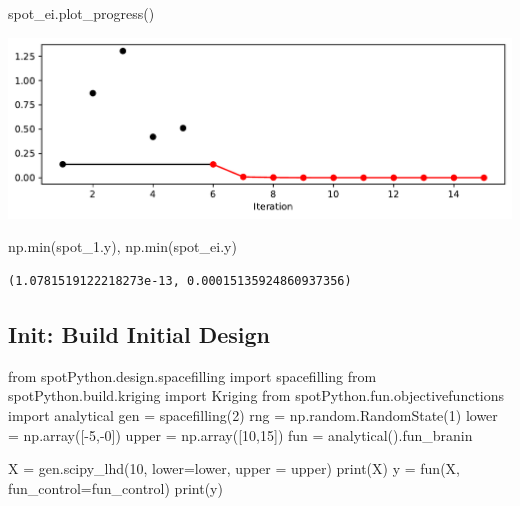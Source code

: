 \documentclass[
  letterpaper,
  DIV=11,
  numbers=noendperiod]{scrreprt}
\newenvironment{Shaded}{\begin{snugshade}}{\end{snugshade}}
\newcommand{\BuiltInTok}[1]{\textcolor[rgb]{0.00,0.23,0.31}{#1}}
\newcommand{\DecValTok}[1]{\textcolor[rgb]{0.68,0.00,0.00}{#1}}
\newcommand{\ImportTok}[1]{\textcolor[rgb]{0.00,0.46,0.62}{#1}}
\newcommand{\NormalTok}[1]{\textcolor[rgb]{0.00,0.23,0.31}{#1}}
\newcommand{\OperatorTok}[1]{\textcolor[rgb]{0.37,0.37,0.37}{#1}}
\begin{document}
\begin{Shaded}
\begin{Highlighting}[]
\NormalTok{spot\_ei.plot\_progress()}
\end{Highlighting}
\end{Shaded}

\includegraphics{012_num_spot_ei_files/figure-pdf/cell-18-output-1.pdf}

\begin{Shaded}
\begin{Highlighting}[]
\NormalTok{np.}\BuiltInTok{min}\NormalTok{(spot\_1.y), np.}\BuiltInTok{min}\NormalTok{(spot\_ei.y)}
\end{Highlighting}
\end{Shaded}

\begin{verbatim}
(1.0781519122218273e-13, 0.00015135924860937356)
\end{verbatim}

\subsection{Init: Build Initial Design}\label{init-build-initial-design}

\begin{Shaded}
\begin{Highlighting}[]
\ImportTok{from}\NormalTok{ spotPython.design.spacefilling }\ImportTok{import}\NormalTok{ spacefilling}
\ImportTok{from}\NormalTok{ spotPython.build.kriging }\ImportTok{import}\NormalTok{ Kriging}
\ImportTok{from}\NormalTok{ spotPython.fun.objectivefunctions }\ImportTok{import}\NormalTok{ analytical}
\NormalTok{gen }\OperatorTok{=}\NormalTok{ spacefilling(}\DecValTok{2}\NormalTok{)}
\NormalTok{rng }\OperatorTok{=}\NormalTok{ np.random.RandomState(}\DecValTok{1}\NormalTok{)}
\NormalTok{lower }\OperatorTok{=}\NormalTok{ np.array([}\OperatorTok{{-}}\DecValTok{5}\NormalTok{,}\OperatorTok{{-}}\DecValTok{0}\NormalTok{])}
\NormalTok{upper }\OperatorTok{=}\NormalTok{ np.array([}\DecValTok{10}\NormalTok{,}\DecValTok{15}\NormalTok{])}
\NormalTok{fun }\OperatorTok{=}\NormalTok{ analytical().fun\_branin}

\NormalTok{X }\OperatorTok{=}\NormalTok{ gen.scipy\_lhd(}\DecValTok{10}\NormalTok{, lower}\OperatorTok{=}\NormalTok{lower, upper }\OperatorTok{=}\NormalTok{ upper)}
\BuiltInTok{print}\NormalTok{(X)}
\NormalTok{y }\OperatorTok{=}\NormalTok{ fun(X, fun\_control}\OperatorTok{=}\NormalTok{fun\_control)}
\BuiltInTok{print}\NormalTok{(y)}
\end{Highlighting}
\end{Shaded}
\end{document}
